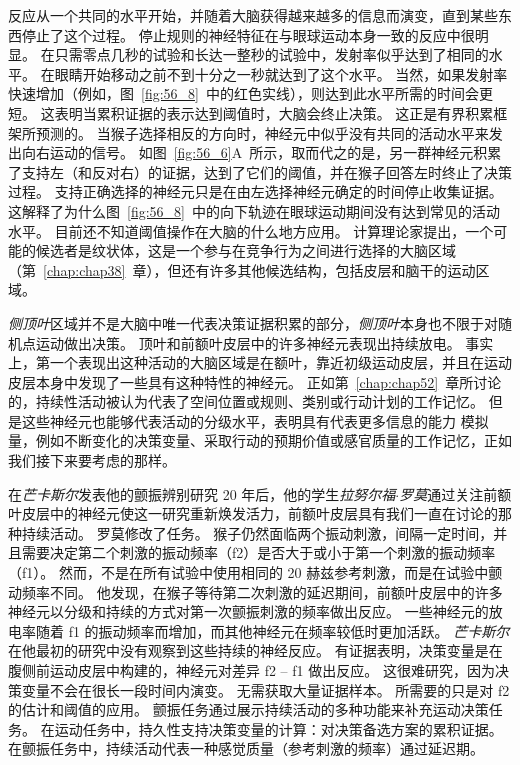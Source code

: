 反应从一个共同的水平开始，并随着大脑获得越来越多的信息而演变，直到某些东西停止了这个过程。
停止规则的神经特征在与眼球运动本身一致的反应中很明显。
在只需零点几秒的试验和长达一整秒的试验中，发射率似乎达到了相同的水平。
在眼睛开始移动之前不到十分之一秒就达到了这个水平。
当然，如果发射率快速增加（例如，图~\ref{fig:56_8}~中的红色实线），则达到此水平所需的时间会更短。 这表明当累积证据的表示达到阈值时，大脑会终止决策。
这正是有界积累框架所预测的。
当猴子选择相反的方向时，神经元中似乎没有共同的活动水平来发出向右运动的信号。
如图~\ref{fig:56_6}A~所示，取而代之的是，另一群神经元积累了支持左（和反对右）的证据，达到了它们的阈值，并在猴子回答左时终止了决策过程。
支持正确选择的神经元只是在由左选择神经元确定的时间停止收集证据。
这解释了为什么图~\ref{fig:56_8}~中的向下轨迹在眼球运动期间没有达到常见的活动水平。
目前还不知道阈值操作在大脑的什么地方应用。
计算理论家提出，一个可能的候选者是纹状体，这是一个参与在竞争行为之间进行选择的大脑区域（第~\ref{chap:chap38}~章），但还有许多其他候选结构，包括皮层和脑干的运动区域。


\textit{侧顶叶}区域并不是大脑中唯一代表决策证据积累的部分，\textit{侧顶叶}本身也不限于对随机点运动做出决策。
顶叶和前额叶皮层中的许多神经元表现出持续放电。
事实上，第一个表现出这种活动的大脑区域是在额叶，靠近初级运动皮层，并且在运动皮层本身中发现了一些具有这种特性的神经元。
正如第~\ref{chap:chap52}~章所讨论的，持续性活动被认为代表了空间位置或规则、类别或行动计划的工作记忆。
但是这些神经元也能够代表活动的分级水平，表明具有代表更多信息的能力 模拟量，例如不断变化的决策变量、采取行动的预期价值或感官质量的工作记忆，正如我们接下来要考虑的那样。


在\textit{芒卡斯尔}发表他的颤振辨别研究 20 年后，他的学生\textit{拉努尔福$\cdot$罗莫}通过关注前额叶皮层中的神经元使这一研究重新焕发活力，前额叶皮层具有我们一直在讨论的那种持续活动。
罗莫修改了任务。
猴子仍然面临两个振动刺激，间隔一定时间，并且需要决定第二个刺激的振动频率（f2）是否大于或小于第一个刺激的振动频率（f1）。
然而，不是在所有试验中使用相同的 20 赫兹参考刺激，而是在试验中颤动频率不同。
他发现，在猴子等待第二次刺激的延迟期间，前额叶皮层中的许多神经元以分级和持续的方式对第一次颤振刺激的频率做出反应。
一些神经元的放电率随着 f1 的振动频率而增加，而其他神经元在频率较低时更加活跃。
\textit{芒卡斯尔}在他最初的研究中没有观察到这些持续的神经反应。
有证据表明，决策变量是在腹侧前运动皮层中构建的，神经元对差异 f2 – f1 做出反应。
这很难研究，因为决策变量不会在很长一段时间内演变。 无需获取大量证据样本。
所需要的只是对 f2 的估计和阈值的应用。
颤振任务通过展示持续活动的多种功能来补充运动决策任务。
在运动任务中，持久性支持决策变量的计算：对决策备选方案的累积证据。
在颤振任务中，持续活动代表一种感觉质量（参考刺激的频率）通过延迟期。



